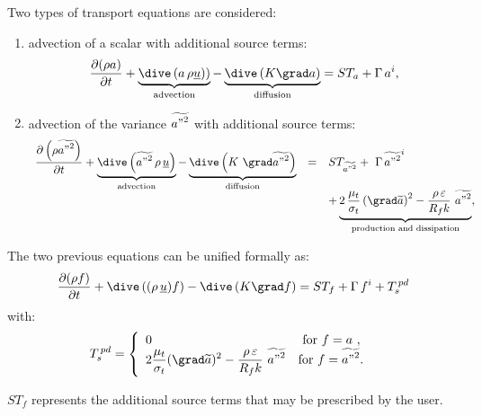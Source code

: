 Two types of transport equations are considered: 
%
\begin{enumerate}[ label=\roman{*}/, ref=(\roman{*})]
\item advection of a scalar with additional source terms:
\begin{equation}
\frac{\partial (\rho a)}{\partial t} +
\underbrace{
\dive \left( a \, \rho \underline{u})
\right)
}_{\text{advection}}
-\underbrace{
\dive \left( K\grad a \right) 
}_{
\text{diffusion}} = ST_{a}+\Gamma \,a^{i},
\end{equation}%

\item advection of the variance $\widetilde{{a"}^{2}}$ with
additional source terms:
\begin{equation}
\begin{array}{rcl}
\displaystyle\frac{\partial \left(\rho \widetilde{{a"}^{2}}\right)}{\partial t}+%
\underbrace{
\dive \left( \widetilde{{a"}^{2}} \, \rho \,\underline{u} \right)
}_{\text{advection}}
-\underbrace{
\dive \left( K\ \grad\widetilde{{a"}^{2}} \right)
}_{\text{diffusion}}
&=&ST_{\widetilde{{a"}^{2}}}+ \ \Gamma \, \widetilde{{a"}^{2}}^{i} 
\\
& &\displaystyle +
\underbrace{
2\,\frac{\mu _{t}}{\sigma _{t}} \left( \grad\widetilde{a} \right)^{2}-
\frac{\rho \,\varepsilon }{R_{f}k}\ \widetilde{{a"}^{2}}
}_{\text{production and dissipation}} ,
\end{array}%
\end{equation}%
\end{enumerate}


The two previous equations can be unified formally as:
\begin{equation}\label{eq:base_introd_depart}%
\frac{\partial (\rho f)}{\partial t}+\dive\,((\rho \,\underline{u})f)-\dive%
\,(K\grad f)=ST_{f}+\Gamma \,f^{i}+T_{s}^{\,pd}  
\end{equation}%
with:
\begin{equation}
\displaystyle T_{s}^{\,pd} = 
\left\{
\begin{array}{ll}
 0 & \text{ for $f=a$ }, \\
 2 \displaystyle \frac{\mu_t}{\sigma_t}(\grad \widetilde{a})^2 - \displaystyle
\frac{\rho\,\varepsilon}{R_f k}\ \widetilde{{a"}^2} & \text{for
$f=\widetilde{{a"}^2}$. }
\end{array}%
\right.
\end{equation}

$ST_f$ represents the additional source terms that may be prescribed by the
user.
